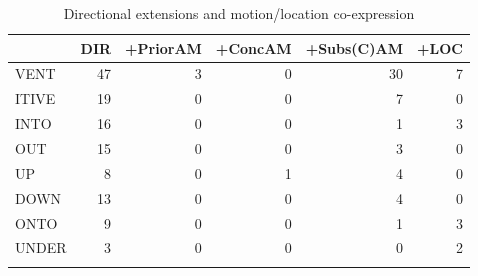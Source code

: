 \begin{table}
	\caption{Directional extensions and motion/location co-expression}
	\label{tab:DR_plusTABLE2}
	\begin{tabular}{lrrrrr} %
		\lsptoprule
		{} &  DIR &  +PriorAM &  +ConcAM &  +Subs(C)AM &  +LOC \\
		\midrule
VENT &   47 &        3 &       0 &         30 &    7 \\
ITIVE &   19 &        0 &       0 &          7 &    0 \\
INTO &   16 &        0 &       0 &          1 &    3 \\
OUT &   15 &        0 &       0 &          3 &    0 \\
UP &    8 &        0 &       1 &          4 &    0 \\
DOWN &   13 &        0 &       0 &          4 &    0 \\
ONTO &    9 &        0 &       0 &          1 &    3 \\
UNDER &    3 &        0 &       0 &          0 &    2 \\
		\lspbottomrule
	\end{tabular}
\end{table}

